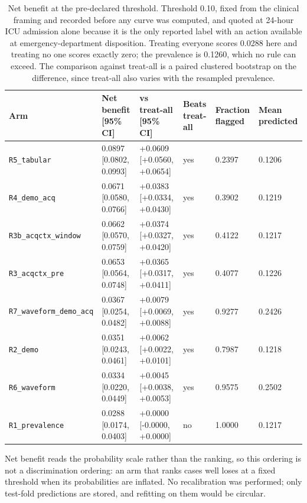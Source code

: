 \begin{table}[t]
\centering
\small
\caption{Net benefit at the pre-declared threshold. Threshold 0.10, fixed from the clinical framing and recorded before any curve was computed, and quoted at 24-hour ICU admission alone because it is the only reported label with an action available at emergency-department disposition. Treating everyone scores 0.0288 here and treating no one scores exactly zero; the prevalence is 0.1260, which no rule can exceed. The comparison against treat-all is a paired clustered bootstrap on the difference, since treat-all also varies with the resampled prevalence.}
\label{tab:net_benefit}
\begin{tabular}{llllll}
\toprule
Arm & Net benefit [95\% CI] & vs treat-all [95\% CI] & Beats treat-all & Fraction flagged & Mean predicted \\
\midrule
\texttt{R5\_tabular} & 0.0897 [0.0802, 0.0993] & +0.0609 [+0.0560, +0.0654] & yes & 0.2397 & 0.1206 \\
\texttt{R4\_demo\_acq} & 0.0671 [0.0580, 0.0766] & +0.0383 [+0.0334, +0.0430] & yes & 0.3902 & 0.1219 \\
\texttt{R3b\_acqctx\_window} & 0.0662 [0.0570, 0.0759] & +0.0374 [+0.0327, +0.0420] & yes & 0.4122 & 0.1217 \\
\texttt{R3\_acqctx\_pre} & 0.0653 [0.0564, 0.0748] & +0.0365 [+0.0317, +0.0411] & yes & 0.4077 & 0.1226 \\
\texttt{R7\_waveform\_demo\_acq} & 0.0367 [0.0254, 0.0482] & +0.0079 [+0.0069, +0.0088] & yes & 0.9277 & 0.2426 \\
\texttt{R2\_demo} & 0.0351 [0.0243, 0.0461] & +0.0062 [+0.0022, +0.0101] & yes & 0.7987 & 0.1218 \\
\texttt{R6\_waveform} & 0.0334 [0.0220, 0.0449] & +0.0045 [+0.0038, +0.0053] & yes & 0.9575 & 0.2502 \\
\texttt{R1\_prevalence} & 0.0288 [0.0174, 0.0403] & +0.0000 [-0.0000, +0.0000] & no & 1.0000 & 0.1217 \\
\bottomrule
\end{tabular}
\par\footnotesize Net benefit reads the probability scale rather than the ranking, so this ordering is not a discrimination ordering: an arm that ranks cases well loses at a fixed threshold when its probabilities are inflated. No recalibration was performed; only test-fold predictions are stored, and refitting on them would be circular.
\end{table}

